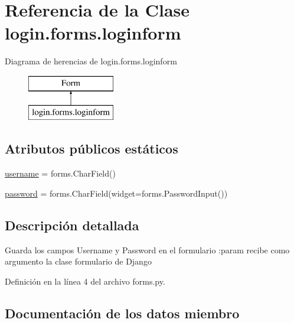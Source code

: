 \hypertarget{classlogin_1_1forms_1_1loginform}{}\section{Referencia de la Clase login.\+forms.\+loginform}
\label{classlogin_1_1forms_1_1loginform}
Diagrama de herencias de login.\+forms.\+loginform\begin{figure}[H]
\begin{center}
\leavevmode
\includegraphics[height=2.000000cm]{classlogin_1_1forms_1_1loginform}
\end{center}
\end{figure}
\subsection*{Atributos públicos estáticos}
\begin{DoxyCompactItemize}
\item 
\hyperlink{classlogin_1_1forms_1_1loginform_af34b8fea30fba76707157184bdb0fe04}{username} = forms.\+Char\+Field()
\item 
\hyperlink{classlogin_1_1forms_1_1loginform_a5ef2fe1a9fad254fe4246fb24bdd6850}{password} = forms.\+Char\+Field(widget=forms.\+Password\+Input())
\end{DoxyCompactItemize}


\subsection{Descripción detallada}
\begin{DoxyVerb}    Guarda los campos Username y Password en el formulario
    :param recibe como argumento la clase formulario de Django
\end{DoxyVerb}
 

Definición en la línea 4 del archivo forms.\+py.



\subsection{Documentación de los datos miembro}
